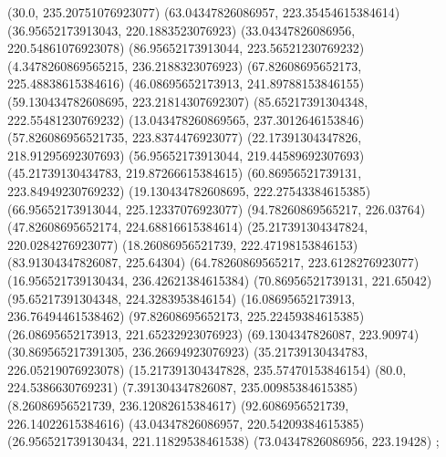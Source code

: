 {{{		(30.0, 235.20751076923077)
		(63.04347826086957, 223.35454615384614)
		(36.95652173913043, 220.1883523076923)
		(33.04347826086956, 220.54861076923078)
		(86.95652173913044, 223.56521230769232)
		(4.3478260869565215, 236.2188323076923)
		(67.82608695652173, 225.48838615384616)
		(46.08695652173913, 241.89788153846155)
		(59.130434782608695, 223.21814307692307)
		(85.65217391304348, 222.55481230769232)
		(13.043478260869565, 237.3012646153846)
		(57.826086956521735, 223.8374476923077)
		(22.17391304347826, 218.91295692307693)
		(56.95652173913044, 219.44589692307693)
		(45.21739130434783, 219.87266615384615)
		(60.86956521739131, 223.84949230769232)
		(19.130434782608695, 222.27543384615385)
		(66.95652173913044, 225.12337076923077)
		(94.78260869565217, 226.03764)
		(47.82608695652174, 224.68816615384614)
		(25.217391304347824, 220.0284276923077)
		(18.26086956521739, 222.47198153846153)
		(83.91304347826087, 225.64304)
		(64.78260869565217, 223.6128276923077)
		(16.956521739130434, 236.42621384615384)
		(70.86956521739131, 221.65042)
		(95.65217391304348, 224.3283953846154)
		(16.08695652173913, 236.76494461538462)
		(97.82608695652173, 225.22459384615385)
		(26.08695652173913, 221.65232923076923)
		(69.1304347826087, 223.90974)
		(30.869565217391305, 236.26694923076923)
		(35.21739130434783, 226.05219076923078)
		(15.217391304347828, 235.57470153846154)
		(80.0, 224.5386630769231)
		(7.391304347826087, 235.00985384615385)
		(8.26086956521739, 236.12082615384617)
		(92.6086956521739, 226.14022615384616)
		(43.04347826086957, 220.54209384615385)
		(26.956521739130434, 221.11829538461538)
		(73.04347826086956, 223.19428)
	};

}}
